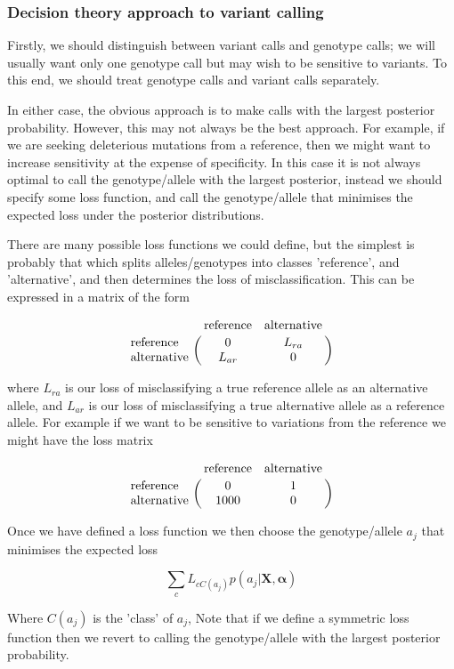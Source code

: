 \documentclass{article}
\begin{document}
\subsubsection{Decision theory approach to variant calling}

Firstly, we should distinguish between variant calls and genotype calls; we will usually want only one genotype call but may wish to be sensitive to variants. To this end, we should treat genotype calls and variant calls separately.

In either case, the obvious approach is to make calls with the largest posterior probability. However, this may not always be the best approach. For example, if we are seeking deleterious mutations from a reference, then we might want to increase sensitivity at the expense of specificity. In this case it is not always optimal to call the genotype/allele with the largest posterior, instead we should specify some loss function, and call the genotype/allele that minimises the expected loss under the posterior distributions.

There are many possible loss functions we could define, but the simplest is probably that which splits alleles/genotypes into classes 'reference', and 'alternative', and then determines the loss of misclassification. This can be expressed in a matrix of the form

\begin{equation}
\bordermatrix{~ & \text{reference} & \text{alternative} \cr
              \text{reference} & 0 & L_{ra} \cr
              \text{alternative} & L_{ar} & 0 \cr}
\end{equation}

where $L_{ra}$ is our loss of misclassifying a true reference allele as an alternative allele, and $L_{ar}$ is our loss of misclassifying a true alternative allele as a reference allele. For example if we want to be sensitive to variations from the reference we might have the loss matrix

\begin{equation}
\bordermatrix{~ & \text{reference} & \text{alternative} \cr
              \text{reference} & 0 & 1 \cr
              \text{alternative} & 1000 & 0 \cr}
\end{equation}

Once we have defined a loss function we then choose the genotype/allele $a_j$ that minimises the expected loss

\begin{equation}
\sum_{c} L_{cC(a_j)}p(a_j | \boldsymbol{X}, \boldsymbol{\alpha})
\end{equation}

Where $C(a_j)$ is the 'class' of $a_j$, Note that if we define a symmetric loss function then we revert to calling the genotype/allele with the largest posterior probability.
\end{document}

